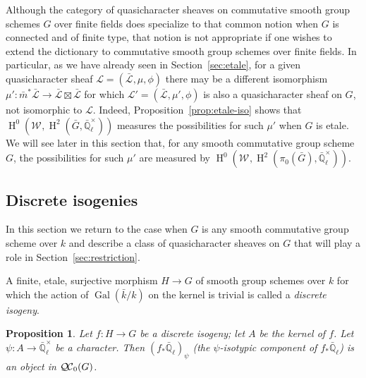 \documentclass{amsart}
\theoremstyle{plain}
\newtheorem{proposition}[theorem]{Proposition}
\theoremstyle{definition}
\theoremstyle{remark}
\newcommand{\EE}{\mathbb{\bar Q}_\ell}
\newcommand{\bFq}{\bar{k}}
\newcommand{\Fq}{k}
\newcommand{\EEx}{\EE^\times}
\newcommand{\Weil}[1]{\mathcal{W}_{#1}}
\DeclareMathOperator{\Gal}{Gal}
\DeclareMathOperator{\Hh}{H}
\newcommand{\iso}{{\ \cong\ }}
\newcommand{\qcs}[1]{{\mathcal{#1}}}
\newcommand{\gqcs}[1]{{\mathcal{\bar #1}}}
\newcommand{\QC}{{\mathcal{Q\hskip-0.8pt C}}}
\newcommand{\bQC}{{\QC_0}}
\newcommand{\bm}{\bar{m}}
\newcommand{\bG}{\bar{G}}
\begin{document}

Although the category of quasicharacter sheaves on commutative smooth group schemes $G$ over finite fields does specialize to that common notion when $G$ is connected and of finite type, that notion is not appropriate if one wishes to extend the dictionary to commutative smooth group schemes over finite fields. 
In particular, as we have already seen in Section~\ref{sec:etale}, for a given quasicharacter sheaf $\qcs{L} = (\gqcs{L},\mu,\phi)$ there may be a different isomorphism $\mu' : \bm^*\gqcs{L} \to \gqcs{L}\boxtimes\gqcs{L}$ for which $\qcs{L}'=(\gqcs{L},\mu',\phi)$ is also a quasicharacter sheaf on $G$, not isomorphic to $\qcs{L}$. 
Indeed, Proposition~\ref{prop:etale-iso} shows that $\Hh^0(\Weil{},\Hh^2(\bG,\EEx))$ measures the possibilities for such $\mu'$ when $G$ is etale.
We will see later in this section that, for any smooth commutative group scheme $G$, the possibilities for such $\mu'$ are measured by $\Hh^0(\Weil{},\Hh^2(\pi_0(\bG),\EEx))$.

\subsection{Discrete isogenies}\label{sec:discrete_isogenies}

In this section we return to the case when $G$ is any smooth commutative group scheme over $\Fq$ and describe a class of quasicharacter sheaves on $G$ that will play a role in Section~\ref{sec:restriction}.

A finite, etale, surjective morphism $H\to G$ of smooth group schemes over $\Fq$ for which the action of $\Gal(\bFq/\Fq)$ on the kernel is trivial is called a {\it discrete isogeny}.

\begin{proposition}\label{prop:finite}
Let $f: H \to G$ be a discrete isogeny; let $A$ be the kernel of $f$.
Let $\psi : A \to \EEx$ be a character.
Then $(f_* \EE)_\psi$ (the $\psi$-isotypic component of $f_*\EE$) is an object in $\bQC(G)$.
\end{proposition}
\end{document}
